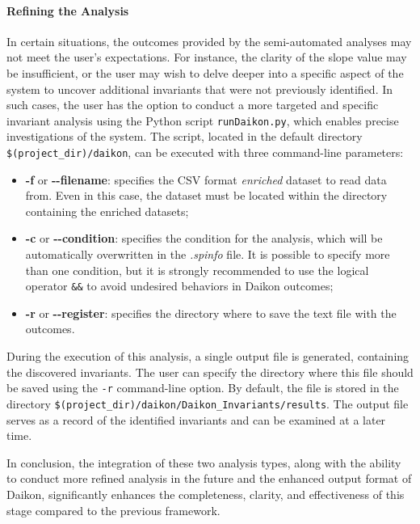 \paragraph{Refining the Analysis}
\label{par:4_refining_analysis}
In certain situations, the outcomes provided by the semi-automated analyses may not meet the user's expectations. For instance, the clarity of the slope value may be insufficient, or the user may wish to delve deeper into a specific aspect of the system to uncover additional invariants that were not previously identified. In such cases, the user has the option to conduct a more targeted and specific invariant analysis using the Python script \texttt{runDaikon.py}, which enables precise investigations of the system.\newline
The script, located in the default directory \texttt{\$(project\_dir)/daikon}, can be executed with three command-line parameters:

\begin{itemize}
	\item \textbf{-f} or \textbf{{-}{-}filename}: specifies the CSV format \textit{enriched} dataset to read data from. Even in this case, the dataset must be located within the directory containing the enriched datasets;
	\item \textbf{-c} or \textbf{{-}{-}condition}: specifies the condition for the analysis, which will be automatically overwritten in the \textit{.spinfo} file. It is possible to specify more than one condition, but it is strongly recommended to use the logical operator \texttt{\&\&} to avoid undesired behaviors in Daikon outcomes;
	\item \textbf{-r} or \textbf{{-}{-}register}: specifies the directory where to save the text file with the outcomes.
\end{itemize}
During the execution of this analysis, a single output file is generated, containing the discovered invariants. The user can specify the directory where this file should be saved using the \texttt{-r} command-line option. By default, the file is stored in the directory \texttt{\$(project\_dir)/daikon/Daikon\_Invariants/results}. The output file serves as a record of the identified invariants and can be examined at a later time. 

\bigskip
In conclusion, the integration of these two analysis types, along with the ability to conduct more refined analysis in the future and the enhanced output format of Daikon, significantly enhances the completeness, clarity, and effectiveness of this stage compared to the previous framework.

